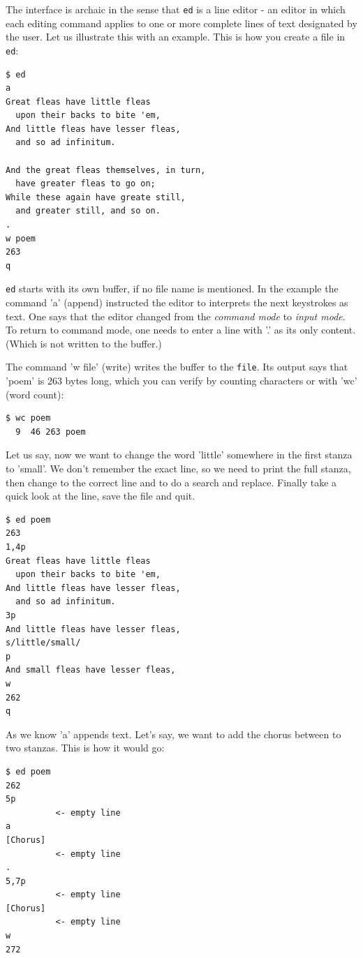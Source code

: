 \documentclass[11pt,a4paper,twoside]{article}
\begin{document}
The interface is archaic in the sense that \texttt{ed} is a line editor - 
an editor in which each editing command applies to one or more complete 
lines of text designated by the user. Let us illustrate this with an 
example. This is how you create a file in \texttt{ed}:


\begin{lstlisting}[frame=single]
$ ed
a
Great fleas have little fleas
  upon their backs to bite 'em,
And little fleas have lesser fleas,
  and so ad infinitum.

And the great fleas themselves, in turn,
  have greater fleas to go on;
While these again have greate still,
  and greater still, and so on.
.
w poem
263
q
\end{lstlisting}

\texttt{ed} starts with its own buffer, if no file name is mentioned.
In the example the command 'a' (append) instructed the editor to interprets
the next keystrokes as text. One says that the editor changed from the 
\emph{command mode} to \emph{input mode}. To return to command mode, one 
needs to enter a line with '.' as its only content. (Which is not written 
to the buffer.)

The command 'w file' (write) writes the buffer to the \texttt{file}. Its
output says that 'poem' is 263 bytes long, which you can verify by 
counting characters or with 'wc' (word count):

\begin{lstlisting}[frame=single]
$ wc poem
  9  46 263 poem
\end{lstlisting}

Let us say, now we want to change the word 'little' somewhere in the first
stanza to 'small'. We don't remember the exact line, so we need to print
the full stanza, then change to the correct line and to do a search and 
replace. Finally take a quick look at the line, save the file and quit.

\begin{lstlisting}[frame=single]
$ ed poem
263
1,4p
Great fleas have little fleas
  upon their backs to bite 'em,
And little fleas have lesser fleas,
  and so ad infinitum.
3p
And little fleas have lesser fleas,
s/little/small/
p
And small fleas have lesser fleas,
w
262
q
\end{lstlisting}

As we know 'a' appends text. Let's say, we want to add the chorus between
to two stanzas. This is how it would go:

\begin{lstlisting}[frame=single]
$ ed poem
262
5p
          <- empty line
a
[Chorus]
          <- empty line
.
5,7p
          <- empty line
[Chorus]
          <- empty line
w
272
\end{lstlisting}
\end{document}
